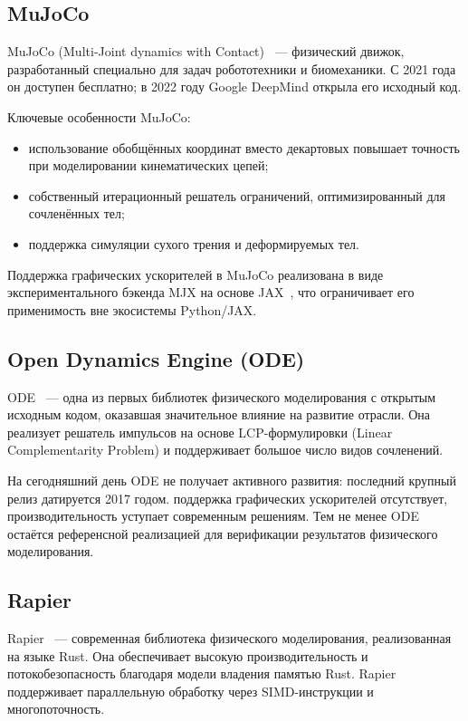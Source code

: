 \subsection{MuJoCo}

MuJoCo (Multi-Joint dynamics with Contact)~\cite{todorov2012mujoco} --- физический движок, разработанный 
специально для задач робототехники и биомеханики. С 2021 года он доступен бесплатно; в 2022 году Google 
DeepMind открыла его исходный код.

Ключевые особенности MuJoCo:

\begin{itemize}
  \item использование обобщённых координат вместо декартовых повышает точность при моделировании кинематических цепей;
  \item собственный итерационный решатель ограничений, оптимизированный для сочленённых тел;
  \item поддержка симуляции сухого трения и деформируемых тел.
\end{itemize}

Поддержка графических ускорителей в MuJoCo реализована в виде экспериментального бэкенда MJX на основе 
JAX~\cite{mjx2023}, что ограничивает его применимость вне экосистемы Python/JAX.

\subsection{Open Dynamics Engine (ODE)}

ODE~\cite{smith2005ode} --- одна из первых библиотек физического моделирования с открытым исходным кодом, 
оказавшая значительное влияние на развитие отрасли. Она реализует решатель импульсов на основе 
LCP-формулировки (Linear Complementarity Problem) и поддерживает большое число видов сочленений.

На сегодняшний день ODE не получает активного развития: последний крупный релиз датируется 2017 годом. 
поддержка графических ускорителей отсутствует, производительность уступает современным решениям. Тем не менее 
ODE остаётся референсной реализацией для верификации результатов физического моделирования.

\subsection{Rapier}

Rapier~\cite{crozet2021rapier} --- современная библиотека физического моделирования, реализованная на языке 
Rust. Она обеспечивает высокую производительность и потокобезопасность благодаря модели владения памятью Rust. 
Rapier поддерживает параллельную обработку через SIMD-инструкции и многопоточность.

